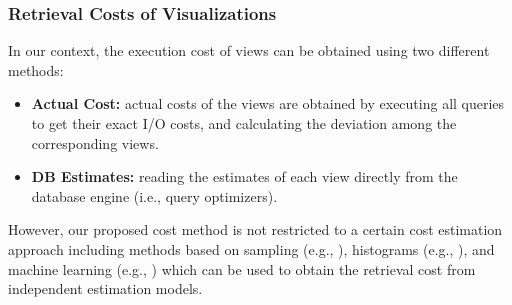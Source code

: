 \subsubsection{Retrieval Costs of Visualizations}
\label{sec:ret_cost_view}
%
In our context, the execution cost of views can be obtained using two different methods:
\begin{itemize}
\item \textbf{Actual Cost:} actual costs of the views are obtained by executing all queries to get their exact I/O costs, and calculating the deviation among the corresponding views.
%
\item \textbf{DB Estimates:} reading the estimates of each view directly from the database engine (i.e., query optimizers).
\end{itemize}
However, our proposed cost method is not restricted to a certain cost estimation approach including 
methods based on sampling (e.g., \cite{Hou:1991:SEA:115302.115300,Lipton:1990:PSE:93597.93611}), histograms (e.g., \cite{Ioannidis:2003:HH:1315451.1315455}), and machine learning (e.g., \cite{Getoor:2001:SEU:375663.375727,Stillger:2001:LDL:645927.672349}) which can be used to obtain the retrieval cost from independent estimation models.
%
